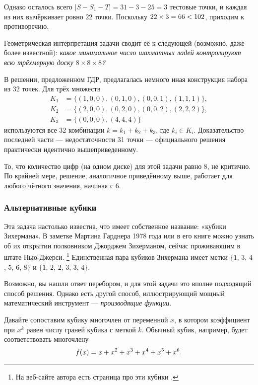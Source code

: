 Однако осталось всего $|S - S_1 - T | = 31 - 3 - 25 = 3$ тестовые точки, и каждая из них вычёркивает ровно $22$ точки.
Поскольку $22 \times 3 = 66 \z< 102$, приходим к противоречию. 

\begin{addedbytheeditors}
Геометрическая интерпретация задачи сводит её к следующей (возможно, даже более известной):
\textit{какое минимальное число шахматных ладей контролируют всю трёхмерную доску $8\times8\times8$?}

В решении, предложенном ГДР, предлагалась немного иная конструкция набора из 32 точек.
Для трёх множеств
\begin{align*}
K_1&=\{(1,0,0), (0,1,0),(0,0,1),(1,1,1)\},
\\
K_2&=\{(2,0,0), (0,2,0),(0,0,2),(2,2,2)\},
\\
K_3&=\{(0,0,0), (4,4,4)\}
\end{align*}
используются все 32 комбинации $k=k_1+k_2+k_3$, где $k_i\in K_i$.
Доказательство последней части --- недостаточности 31 точки --- официального решения практически идентично вышеприведенному.

То, что количество цифр (на одном диске) для этой задачи равно 8, не критично. По крайней мере, решение, аналогичное приведённому выше, работает для любого чётного значения, начиная с 6.
\end{addedbytheeditors}

\subsubsection*{Альтернативные кубики}

Эта задача настолько известна, что имеет собственное название: «кубики Зихермана».
В заметке Мартина Гарднера 1978 года \cite{25} или в его книге \cite{28} можно узнать об их открытии полковником Джорджем Зихерманом, сейчас проживающим в штате Нью-Джерси.%
\footnote{На веб-сайте автора есть страница про эти кубики \cite{sicherman}. \pr}
Единственная пара кубиков Зихермана имеет метки $\{1$, $3$, $4$, $5$, $6$, $8\}$ и $\{1$, $2$, $2$, $3$, $3$, $4\}$.

Возможно, вы нашли ответ перебором, и для этой задачи это вполне подходящий способ решения.
Однако есть другой способ, иллюстрирующий мощный математический инструмент --- \emph{производящие функции}.

Давайте сопоставим кубику многочлен от переменной $x$, в котором коэффициент при $x^k$ равен числу граней кубика с меткой $k$.
Обычный кубик, например, будет соответствовать многочлену 
\[f(x) \z= x \z+ x^2 \z+ x^3 \z+ x^4 \z+ x^5 \z+ x^6.\]

